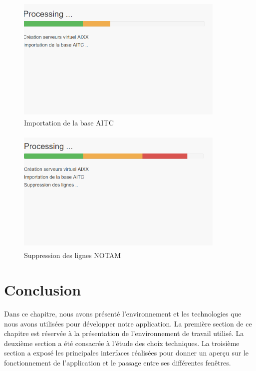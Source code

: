 \begin{figure}[!h]
\begin{center}
\includegraphics[width=10cm,height=6cm]{resultats/processing2.png}
\end{center}
\caption{Importation de la base AITC}
\end{figure}

\begin{figure}[!h]
\begin{center}
\includegraphics[width=10cm,height=6cm]{resultats/processing3.png}
\end{center}
\caption{Suppression des lignes NOTAM}
\end{figure}

\newpage


\section*{Conclusion}
Dans ce chapitre, nous avons présenté l’environnement et les technologies que nous avons
utilisées pour développer notre application. La première section de ce chapitre est réservée
à la présentation de l’environnement de travail utilisé. La deuxième section a été consacrée
à l’étude des choix techniques. La troisième section a exposé les principales interfaces réalisées
pour donner un aperçu sur le fonctionnement de l’application et le passage entre ses différentes
fenêtres.
